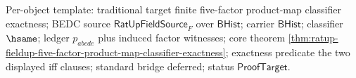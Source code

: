 Per-object template: traditional target finite five-factor product-map
classifier exactness; BEDC source $\mathsf{RatUpFieldSource}_F$ over
$\mathsf{BHist}$; carrier $\mathsf{BHist}$; classifier $\hsame$; ledger
$p_{abcde}$ plus induced factor witnesses; core theorem
\autoref{thm:ratup-fieldup-five-factor-product-map-classifier-exactness};
exactness predicate the two displayed iff clauses; standard bridge deferred;
status $\mathsf{ProofTarget}$.
